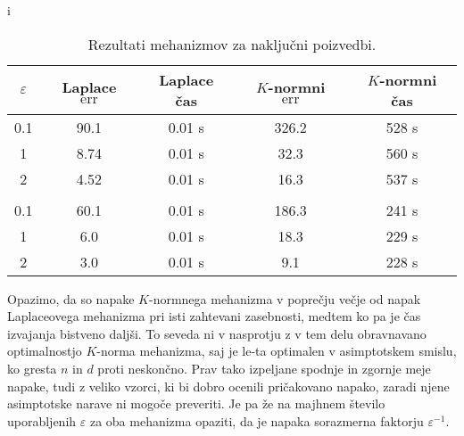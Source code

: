 i\documentclass[mat1]{fmfdelo}
\DeclareMathOperator*{\err}{err}
\begin{document}
\begin{table}[!htb]
\begin{tabular}{ccccc}
\hline
\multicolumn{1}{|c|}{\textbf{$\varepsilon$}} & \multicolumn{1}{c|}{\textbf{Laplace $\err$}} & \multicolumn{1}{c|}{\textbf{Laplace čas}} & \multicolumn{1}{c|}{\textbf{$K$-normni $\err$}} & \multicolumn{1}{c|}{\textbf{$K$-normni čas}} \\ \hline

\multicolumn{1}{|c|}{0.1} & \multicolumn{1}{c|}{90.1} & \multicolumn{1}{c|}{0.01 s} & \multicolumn{1}{c|}{326.2} & \multicolumn{1}{c|}{528 s} \\ \hline

\multicolumn{1}{|c|}{1} & \multicolumn{1}{c|}{8.74} & \multicolumn{1}{c|}{0.01 s} & \multicolumn{1}{c|}{32.3} & \multicolumn{1}{c|}{560 s} \\ \hline

\multicolumn{1}{|c|}{2} & \multicolumn{1}{c|}{4.52} & \multicolumn{1}{c|}{0.01 s} & \multicolumn{1}{c|}{16.3} & \multicolumn{1}{c|}{537 s} \\ \hline

&&&& \\ \hline

\multicolumn{1}{|c|}{0.1} & \multicolumn{1}{c|}{60.1} & \multicolumn{1}{c|}{0.01 s} & \multicolumn{1}{c|}{186.3} & \multicolumn{1}{c|}{241 s} \\ \hline

\multicolumn{1}{|c|}{1} & \multicolumn{1}{c|}{6.0} & \multicolumn{1}{c|}{0.01 s} & \multicolumn{1}{c|}{18.3} & \multicolumn{1}{c|}{229 s} \\ \hline

\multicolumn{1}{|c|}{2} & \multicolumn{1}{c|}{3.0} & \multicolumn{1}{c|}{0.01 s} & \multicolumn{1}{c|}{9.1} & \multicolumn{1}{c|}{228 s} \\ \hline
\end{tabular}
\caption{Rezultati mehanizmov za naključni poizvedbi.} \label{resulttable}
\end{table}

Opazimo, da so napake $K$-normnega mehanizma v poprečju večje od napak Laplaceovega mehanizma pri isti zahtevani zasebnosti, medtem ko pa je čas izvajanja bistveno daljši. To seveda ni v nasprotju z v tem delu obravnavano optimalnostjo $K$-norma mehanizma, saj je le-ta optimalen v asimptotskem smislu, ko gresta $n$ in $d$ proti neskončno. Prav tako izpeljane spodnje in zgornje meje napake, tudi z veliko vzorci, ki bi dobro ocenili pričakovano napako, zaradi njene asimptotske narave ni mogoče preveriti. Je pa že na majhnem število uporabljenih $\varepsilon$ za oba mehanizma opaziti, da je napaka sorazmerna faktorju $\varepsilon^{-1}$.
\end{document}
